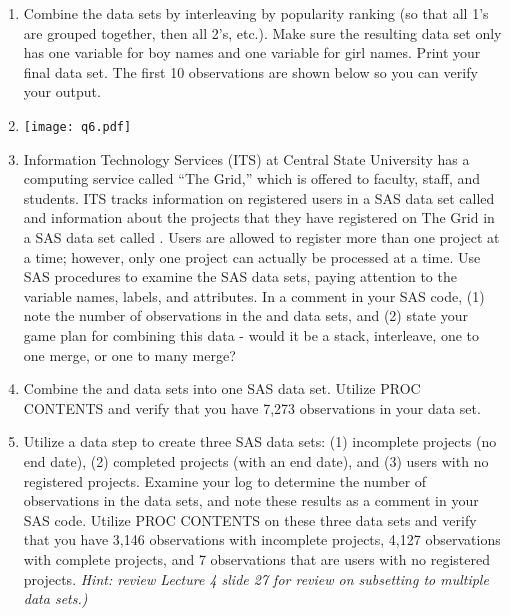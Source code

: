 \begin{enumerate}
\item Combine the data sets by interleaving by popularity ranking (so that all 1's are grouped together, then all 2's, etc.).  Make sure the resulting data set only has one variable for boy names and one variable for girl names.  Print your final data set.  The first 10 observations are shown below so you can verify your output.
\item[]\texttt{[image: q6.pdf]}
\item Information Technology Services (ITS) at Central State University has a computing service called ``The Grid,'' which is offered to faculty, staff, and students.  ITS tracks information on registered users in a SAS data set called  and information about the projects that they have registered on The Grid in a SAS data set called .  Users are allowed to register more than one project at a time; however, only one project can actually be processed at a time.  Use SAS procedures to examine the SAS data sets, paying attention to the variable names, labels, and attributes.  In a comment in your SAS code, (1) note the number of observations in the  and  data sets, and (2) state your game plan for combining this data - would it be a stack, interleave, one to one merge, or one to many merge?
\item Combine the  and  data sets into one SAS data set.  Utilize PROC CONTENTS and verify that you have 7,273 observations in your data set.
\item Utilize a data step to create three SAS data sets: (1) incomplete projects (no end date), (2)  completed projects (with an end date), and (3) users with no registered projects.  Examine your log to determine the number of observations in the data sets, and note these results as a comment in your SAS code.   Utilize PROC CONTENTS on these three data sets and verify that you have 3,146 observations with incomplete projects, 4,127 observations with complete projects, and 7 observations that are users with no registered projects.  \emph{Hint: review Lecture 4 slide 27 for review on subsetting to multiple data sets.)}
\end{enumerate}

 